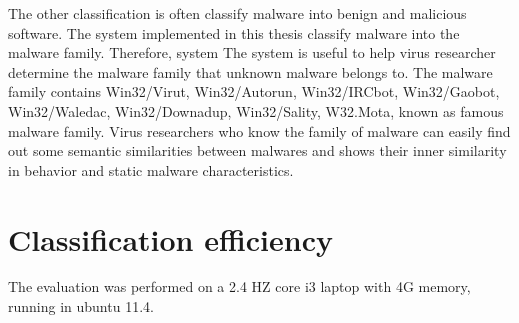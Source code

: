 The other classification is often classify malware into benign and malicious software. The system implemented in this thesis classify malware into the malware family. Therefore, system The system is useful to help virus researcher determine the malware family that unknown malware belongs to. The malware family contains Win32/Virut, Win32/Autorun, Win32/IRCbot, Win32/Gaobot, Win32/Waledac, Win32/Downadup, Win32/Sality, W32.Mota, known as famous malware family. Virus researchers who know the family of malware can easily find out some semantic similarities between malwares and shows their inner similarity in behavior and static malware characteristics.

\section{Classification efficiency}
The evaluation was performed on a 2.4 HZ core i3 laptop with 4G memory, running in ubuntu 11.4. 	

